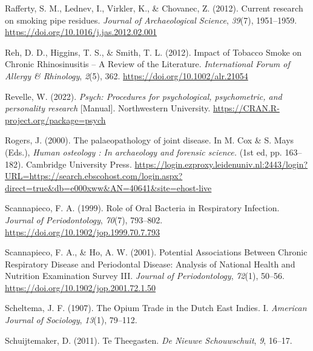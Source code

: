 \documentclass[
]{article}
\newlength{\cslhangindent}
\newlength{\cslentryspacingunit} %
\newenvironment{CSLReferences}[2] %
 {%
  \setlength{\parindent}{0pt}
  \ifodd #1
  \let\oldpar\par
  \def\par{\hangindent=\cslhangindent\oldpar}
  \fi
  \setlength{\parskip}{#2\cslentryspacingunit}
 }%
 {}
\begin{document}
\begin{CSLReferences}{1}{0}
\leavevmode{}%
Rafferty, S. M., Lednev, I., Virkler, K., \& Chovanec, Z. (2012).
Current research on smoking pipe residues. \emph{Journal of
Archaeological Science}, \emph{39}(7), 1951--1959.
\url{https://doi.org/10.1016/j.jas.2012.02.001}

\leavevmode{}%
Reh, D. D., Higgins, T. S., \& Smith, T. L. (2012). Impact of {Tobacco
Smoke} on {Chronic Rhinosinusitis} -- {A Review} of the {Literature}.
\emph{International Forum of Allergy \& Rhinology}, \emph{2}(5), 362.
\url{https://doi.org/10.1002/alr.21054}

\leavevmode{}%
Revelle, W. (2022). \emph{Psych: {Procedures} for psychological,
psychometric, and personality research} {[}Manual{]}. {Northwestern
University}. \url{https://CRAN.R-project.org/package=psych}

\leavevmode{}%
Rogers, J. (2000). The palaeopathology of joint disease. In M. Cox \& S.
Mays (Eds.), \emph{Human osteology : {In} archaeology and forensic
science.} (1st ed, pp. 163--182). {Cambridge University Press}.
\url{https://login.ezproxy.leidenuniv.nl:2443/login?URL=https://search.ebscohost.com/login.aspx?direct=true\&db=e000xww\&AN=40641\&site=ehost-live}

\leavevmode{}%
Scannapieco, F. A. (1999). Role of {Oral Bacteria} in {Respiratory
Infection}. \emph{Journal of Periodontology}, \emph{70}(7), 793--802.
\url{https://doi.org/10.1902/jop.1999.70.7.793}

\leavevmode{}%
Scannapieco, F. A., \& Ho, A. W. (2001). Potential {Associations Between
Chronic Respiratory Disease} and {Periodontal Disease}: {Analysis} of
{National Health} and {Nutrition Examination Survey III}. \emph{Journal
of Periodontology}, \emph{72}(1), 50--56.
\url{https://doi.org/10.1902/jop.2001.72.1.50}

\leavevmode{}%
Scheltema, J. F. (1907). The {Opium Trade} in the {Dutch East Indies}.
{I}. \emph{American Journal of Sociology}, \emph{13}(1), 79--112.

\leavevmode{}%
Schuijtemaker, D. (2011). Te Theegasten. \emph{De Nieuwe Schouwschuit},
\emph{9}, 16--17.


\end{CSLReferences}
\end{document}
